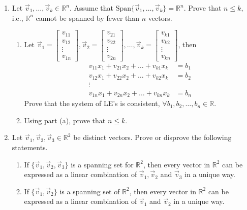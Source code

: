 \documentclass{report}
\newcommand{\R}{{\mathbb{R}}}
\begin{document}
\begin{enumerate}
    \item Let $\vec{v}_1, \dots, \vec{v}_k \in \R^n$. Assume that $\text{Span} \{\vec{v}_1, \dots, \vec{v}_k\} = \R^n$. Prove that $n \le k$, i.e., $\R^n $ cannot be spanned by fewer than $n$ vectors.
    \begin{enumerate}
        \item Let $\vec{v}_1 = \begin{bmatrix} v_{11} \\ v_{12} \\ \vdots \\ v_{1n} \end{bmatrix}, \vec{v}_2 = \begin{bmatrix} v_{21} \\ v_{22} \\ \vdots \\ v_{2n} \end{bmatrix}, \dots, \vec{v}_k = \begin{bmatrix} v_{k1} \\ v_{k2} \\ \vdots \\ v_{kn} \end{bmatrix}$, then
        \begin{align*}
            v_{11}x_1 + v_{21}x_2 + \dots + v_{k1}x_k &= b_1\\
            v_{12}x_1 + v_{22}x_2 + \dots + v_{k2}x_k &= b_2\\
            \vdots\\
            v_{1n}x_1 + v_{2n}x_2 + \dots + v_{kn}x_k &= b_n
        \end{align*}
        Prove that the system of LE's is consistent, $\forall b_1, b_2, \dots, b_n \in \R$.
        \item Using part (a), prove that $n \le k$.
    \end{enumerate}
    \item Let $\vec{v}_1, \vec{v}_2, \vec{v}_3 \in \R^2$ be distinct vectors. Prove or disprove the following statements.
    \begin{enumerate}
        \item If $\{ \vec{v}_1, \vec{v}_2, \vec{v}_3 \}$ is a spanning set for $\R^2$, then every vector in $\R^2$ can be expressed as a linear combination of $\vec{v}_1, \vec{v}_2$ and $\vec{v}_3$ in a unique way.
        \item If $\{\vec{v}_1, \vec{v}_2\}$ is a spanning set of $\R^2$, then every vector in $\R^2$ can be expressed as a linear combination of $\vec{v}_1$ and $\vec{v}_2$ in a unique way.
    \end{enumerate}
\end{enumerate}
\end{document}
